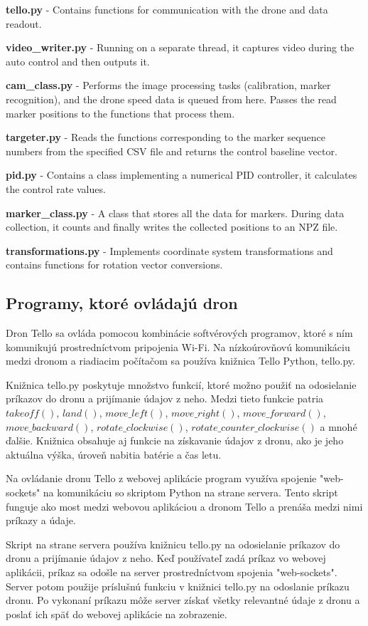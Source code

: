     \textbf{tello.py} - Contains functions for communication with the drone and data readout.

    \textbf{video\_writer.py} - Running on a separate thread, it captures video during the auto control and then outputs it.

    \textbf{cam\_class.py} - Performs the image processing tasks (calibration, marker recognition), and the drone speed data is queued from here. Passes the read marker positions to the functions that process them.

    \textbf{targeter.py} - Reads the functions corresponding to the marker sequence numbers from the specified CSV file and returns the control baseline vector.

    \textbf{pid.py} - Contains a class implementing a numerical PID controller, it calculates the control rate values.

    \textbf{marker\_class.py} - A class that stores all the data for markers. During data collection, it counts and finally writes the collected positions to an NPZ file.

    \textbf{transformations.py} - Implements coordinate system transformations and contains functions for rotation vector conversions.


\subsection{Programy, ktoré ovládajú dron}
Dron Tello sa ovláda pomocou kombinácie softvérových programov, ktoré s ním komunikujú prostredníctvom pripojenia Wi-Fi. Na nízkoúrovňovú komunikáciu medzi dronom a riadiacim počítačom sa používa knižnica Tello Python, tello.py.

Knižnica tello.py poskytuje množstvo funkcií, ktoré možno použiť na odosielanie príkazov do dronu a prijímanie údajov z neho. Medzi tieto funkcie patria 
$takeoff()$, $land()$, $move\_left()$, $move\_right()$, $move\_forward()$, $move\_backward()$, \break $rotate\_clockwise()$, $rotate\_counter\_clockwise()$ 
a mnohé ďalšie. Knižnica obsahuje aj funkcie na získavanie údajov z dronu, ako je jeho aktuálna výška, úroveň nabitia batérie a čas letu.

Na ovládanie dronu Tello z webovej aplikácie program využíva spojenie "web-sockets" na komunikáciu so skriptom Python na strane servera. Tento skript funguje ako most medzi webovou aplikáciou a dronom Tello a prenáša medzi nimi príkazy a údaje.

Skript na strane servera používa knižnicu tello.py na odosielanie príkazov do dronu a prijímanie údajov z neho. Keď používateľ zadá príkaz vo webovej aplikácii, príkaz sa odošle na server prostredníctvom spojenia "web-sockets". Server potom použije príslušnú funkciu v knižnici tello.py na odoslanie príkazu dronu. Po vykonaní príkazu môže server získať všetky relevantné údaje z dronu a poslať ich späť do webovej aplikácie na zobrazenie.

